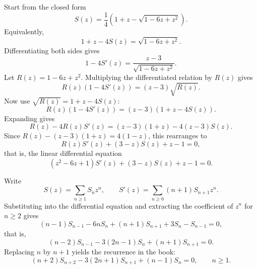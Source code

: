 Start from the closed form
\begin{equation*}
    S(z) = \frac{1}{4}(1 + z - \sqrt{1 - 6z + z^{2}}).
\end{equation*}
Equivalently,
\begin{equation*}
    1 + z - 4S(z) = \sqrt{1 - 6z + z^{2}}.
\end{equation*}
Differentiating both sides gives
\begin{equation*}
    1 - 4S'(z) = \frac{z - 3}{\sqrt{1 - 6z + z^{2}}}.
\end{equation*}
Let $R(z) = 1 - 6z + z^{2}$. Multiplying the differentiated relation by $R(z)$ gives
\begin{equation*}
    R(z)(1 - 4S'(z)) = (z - 3)\sqrt{R(z)}.
\end{equation*}
Now use $\sqrt{R(z)} = 1 + z - 4S(z)$:
\begin{equation*}
    R(z)(1 - 4S'(z)) = (z - 3)(1 + z - 4S(z)).
\end{equation*}
Expanding gives
\begin{equation*}
    R(z) - 4R(z)S'(z) = (z - 3)(1 + z) - 4(z - 3)S(z).
\end{equation*}
Since $R(z) - (z - 3)(1 + z) = 4(1 - z)$, this rearranges to
\begin{equation*}
    R(z)S'(z) + (3 - z)S(z) + z - 1 = 0,
\end{equation*}
that is, the linear differential equation
\begin{equation*}
    (z^{2} - 6z + 1)S'(z) + (3 - z)S(z) + z - 1 = 0.
\end{equation*}

Write
\begin{equation*}
    S(z) = \sum_{n \geq 1} S_{n} z^{n},
    \qquad
    S'(z) = \sum_{n \geq 0} (n + 1)S_{n + 1} z^{n}.
\end{equation*}
Substituting into the differential equation and extracting the coefficient of $z^{n}$ for
$n \geq 2$ gives
\begin{equation*}
    (n - 1)S_{n - 1} - 6nS_{n} + (n + 1)S_{n + 1} + 3S_{n} - S_{n - 1} = 0,
\end{equation*}
that is,
\begin{equation*}
    (n - 2)S_{n - 1} - 3(2n - 1)S_{n} + (n + 1)S_{n + 1} = 0.
\end{equation*}
Replacing $n$ by $n + 1$ yields the recurrence in the book:
\begin{equation*}
    (n + 2)S_{n + 2} - 3(2n + 1)S_{n + 1} + (n - 1)S_{n} = 0,
    \qquad n \geq 1.
\end{equation*}

